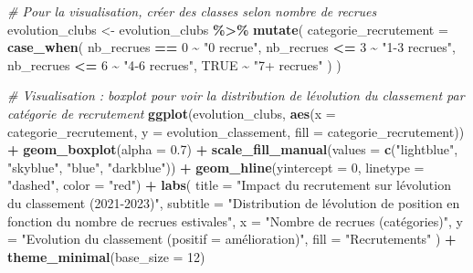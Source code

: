 \documentclass[
]{article}
\newenvironment{Shaded}{\begin{snugshade}}{\end{snugshade}}
\newcommand{\AttributeTok}[1]{\textcolor[rgb]{0.13,0.29,0.53}{#1}}
\newcommand{\CommentTok}[1]{\textcolor[rgb]{0.56,0.35,0.01}{\textit{#1}}}
\newcommand{\ConstantTok}[1]{\textcolor[rgb]{0.56,0.35,0.01}{#1}}
\newcommand{\DecValTok}[1]{\textcolor[rgb]{0.00,0.00,0.81}{#1}}
\newcommand{\FloatTok}[1]{\textcolor[rgb]{0.00,0.00,0.81}{#1}}
\newcommand{\FunctionTok}[1]{\textcolor[rgb]{0.13,0.29,0.53}{\textbf{#1}}}
\newcommand{\NormalTok}[1]{#1}
\newcommand{\OtherTok}[1]{\textcolor[rgb]{0.56,0.35,0.01}{#1}}
\newcommand{\SpecialCharTok}[1]{\textcolor[rgb]{0.81,0.36,0.00}{\textbf{#1}}}
\newcommand{\StringTok}[1]{\textcolor[rgb]{0.31,0.60,0.02}{#1}}
\begin{document}
\begin{Shaded}
\begin{Highlighting}[]
\CommentTok{\# Pour la visualisation, créer des classes selon nombre de recrues}
\NormalTok{evolution\_clubs }\OtherTok{\textless{}{-}}\NormalTok{ evolution\_clubs }\SpecialCharTok{\%\textgreater{}\%}
  \FunctionTok{mutate}\NormalTok{(}
    \AttributeTok{categorie\_recrutement =} \FunctionTok{case\_when}\NormalTok{(}
\NormalTok{      nb\_recrues }\SpecialCharTok{==} \DecValTok{0} \SpecialCharTok{\textasciitilde{}} \StringTok{"0 recrue"}\NormalTok{,}
\NormalTok{      nb\_recrues }\SpecialCharTok{\textless{}=} \DecValTok{3} \SpecialCharTok{\textasciitilde{}} \StringTok{"1{-}3 recrues"}\NormalTok{,}
\NormalTok{      nb\_recrues }\SpecialCharTok{\textless{}=} \DecValTok{6} \SpecialCharTok{\textasciitilde{}} \StringTok{"4{-}6 recrues"}\NormalTok{,}
      \ConstantTok{TRUE} \SpecialCharTok{\textasciitilde{}} \StringTok{"7+ recrues"}
\NormalTok{    )}
\NormalTok{  )}

\CommentTok{\# Visualisation : boxplot pour voir la distribution de l\textquotesingle{}évolution du classement par catégorie de recrutement}
\FunctionTok{ggplot}\NormalTok{(evolution\_clubs, }\FunctionTok{aes}\NormalTok{(}\AttributeTok{x =}\NormalTok{ categorie\_recrutement, }\AttributeTok{y =}\NormalTok{ evolution\_classement, }\AttributeTok{fill =}\NormalTok{ categorie\_recrutement)) }\SpecialCharTok{+}
  \FunctionTok{geom\_boxplot}\NormalTok{(}\AttributeTok{alpha =} \FloatTok{0.7}\NormalTok{) }\SpecialCharTok{+}
  \FunctionTok{scale\_fill\_manual}\NormalTok{(}\AttributeTok{values =} \FunctionTok{c}\NormalTok{(}\StringTok{"lightblue"}\NormalTok{, }\StringTok{"skyblue"}\NormalTok{, }\StringTok{"blue"}\NormalTok{, }\StringTok{"darkblue"}\NormalTok{)) }\SpecialCharTok{+}
  \FunctionTok{geom\_hline}\NormalTok{(}\AttributeTok{yintercept =} \DecValTok{0}\NormalTok{, }\AttributeTok{linetype =} \StringTok{"dashed"}\NormalTok{, }\AttributeTok{color =} \StringTok{"red"}\NormalTok{) }\SpecialCharTok{+}
  \FunctionTok{labs}\NormalTok{(}
    \AttributeTok{title =} \StringTok{"Impact du recrutement sur l\textquotesingle{}évolution du classement (2021{-}2023)"}\NormalTok{,}
    \AttributeTok{subtitle =} \StringTok{"Distribution de l\textquotesingle{}évolution de position en fonction du nombre de recrues estivales"}\NormalTok{,}
    \AttributeTok{x =} \StringTok{"Nombre de recrues (catégories)"}\NormalTok{,}
    \AttributeTok{y =} \StringTok{"Evolution du classement (positif = amélioration)"}\NormalTok{,}
    \AttributeTok{fill =} \StringTok{"Recrutements"}
\NormalTok{  ) }\SpecialCharTok{+}
  \FunctionTok{theme\_minimal}\NormalTok{(}\AttributeTok{base\_size =} \DecValTok{12}\NormalTok{)}
\end{Highlighting}
\end{Shaded}
\end{document}
